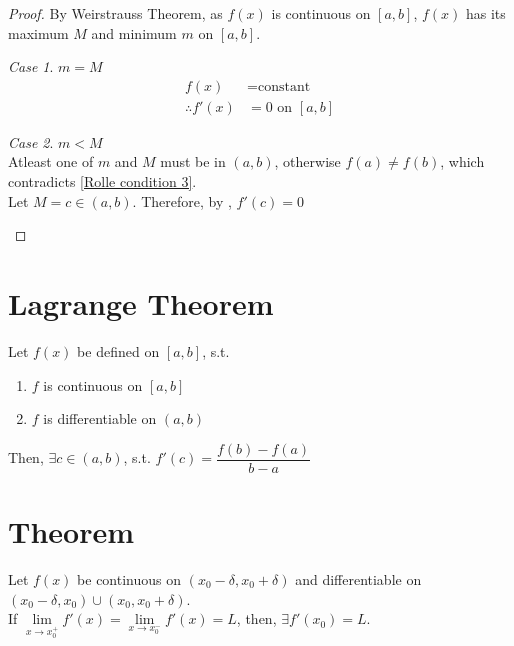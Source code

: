 \documentclass[fleqn]{article}
\theoremstyle{definition}
\theoremstyle{theorem}
\theoremstyle{remark}
\newtheorem{case}{Case}
\begin{document}
\begin{proof}
	By Weirstrauss Theorem, as $f(x)$ is continuous on $[a, b]$, $f(x)$ has its maximum $M$ and minimum $m$ on $[a, b]$. 
	
	\begin{case}
		$m = M$
		\begin{align*}
			f(x) &= \text{constant} \\
			\therefore f'(x) &= 0 \text{ on } [a, b]
		\end{align*}
	\end{case}
	
	\begin{case}
		$m < M$\\
		Atleast one of $m$ and $M$ must be in $(a, b)$, otherwise $f(a) \neq f(b)$, which contradicts \eqref{Rolle condition 3}.\\
		Let $M = c \in (a, b)$. Therefore, by , $f'(c) = 0$
	\end{case}
\end{proof}


\section{Lagrange Theorem}

Let $f(x)$ be defined on $[a, b]$, s.t. 
\begin{enumerate}
	\item $f$ is continuous on $[a, b]$
	\item $f$ is differentiable on $(a, b)$
\end{enumerate}
Then, $\exists c \in (a, b)$, s.t. $f'(c) = \dfrac{f(b) - f(a)}{b - a}$

\section{Theorem}

Let $f(x)$ be continuous on $(x_0 - \delta, x_0 + \delta)$ and differentiable on $(x_0 - \delta, x_0) \cup (x_0, x_0 + \delta)$.\\
If $\lim\limits_{x \rightarrow x_0^+} f'(x) = \lim\limits_{x \rightarrow x_0^-} f'(x) = L$, then, $\exists f'(x_0) = L$.
\end{document}
